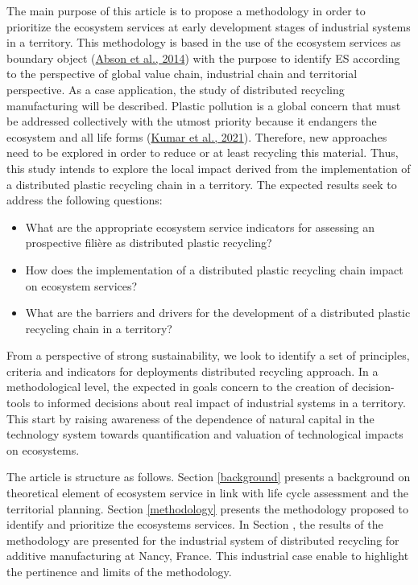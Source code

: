 \documentclass[]{elsarticle} %
\providecommand{\tightlist}{%
  \setlength{\itemsep}{0pt}\setlength{\parskip}{0pt}}
\def\tightlist{}
\begin{document}
The main purpose of this article is to propose a methodology in order to prioritize the ecosystem services at early development stages of industrial systems in a territory.
This methodology is based in the use of the ecosystem services as boundary object (\protect\hyperlink{ref-Abson2014}{Abson et al., 2014}) with the purpose to identify ES according to the perspective of global value chain, industrial chain and territorial perspective.
As a case application, the study of distributed recycling manufacturing will be described.
Plastic pollution is a global concern that must be addressed collectively with the utmost priority because it endangers the ecosystem and all life forms (\protect\hyperlink{ref-Kumar2021}{Kumar et al., 2021}).
Therefore, new approaches need to be explored in order to reduce or at least recycling this material.
Thus, this study intends to explore the local impact derived from the implementation of a distributed plastic recycling chain in a territory.
The expected results seek to address the following questions:

\begin{itemize}
\tightlist
\item
  What are the appropriate ecosystem service indicators for assessing an prospective filière as distributed plastic recycling?
\item
  How does the implementation of a distributed plastic recycling chain impact on ecosystem services?
\item
  What are the barriers and drivers for the development of a distributed plastic recycling chain in a territory?
\end{itemize}

From a perspective of strong sustainability, we look to identify a set of principles, criteria and indicators for deployments distributed recycling approach.
In a methodological level, the expected in goals concern to the creation of decision-tools to informed decisions about real impact of industrial systems in a territory.
This start by raising awareness of the dependence of natural capital in the technology system towards quantification and valuation of technological impacts on ecosystems.

The article is structure as follows.
Section \ref{background} presents a background on theoretical element of ecosystem service in link with life cycle assessment and the territorial planning.
Section \ref{methodology} presents the methodology proposed to identify and prioritize the ecosystems services.
In Section \label{results}, the results of the methodology are presented for the industrial system of distributed recycling for additive manufacturing at Nancy, France.
This industrial case enable to highlight the pertinence and limits of the methodology.
\end{document}
